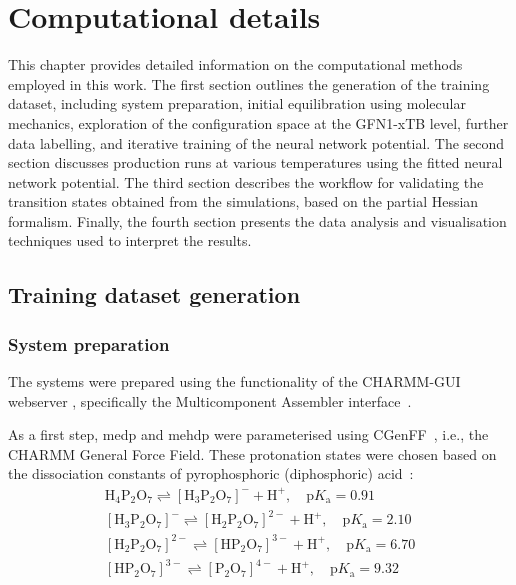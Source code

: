 \chapter{Computational details}
This chapter provides detailed information on the computational methods employed in this work. The first section outlines the generation of the training dataset, including system preparation, initial equilibration using molecular mechanics, exploration of the configuration space at the GFN1-xTB level, further data labelling, and iterative training of the neural network potential. The second section discusses production runs at various temperatures using the fitted neural network potential. The third section describes the workflow for validating the transition states obtained from the simulations, based on the partial Hessian formalism. Finally, the fourth section presents the data analysis and visualisation techniques used to interpret the results.


\section{Training dataset generation}

\subsection{System preparation}
The systems were prepared using the functionality of the CHARMM-GUI webserver \citep{joCHARMMGUIWebbasedGraphical2008}, specifically the Multicomponent Assembler interface~\citep{kernCHARMMGUIMulticomponentAssembler2024}.

As a first step, \acf{medp} and \acf{mehdp} were parameterised using CGenFF~\citep{kimCHARMMGUILigandReader2017}, i.e., the CHARMM General Force Field. These protonation states were chosen based on the dissociation constants of pyrophosphoric (diphosphoric) acid~\citep{haynesCRCHandbookChemistry2016}:
\begin{align*}
    \mathrm{H_4P_2O_7} \rightleftharpoons \mathrm{[H_3P_2O_7]^-} + \mathrm{H^+},\quad \mathrm{p}K_\mathrm{a} = 0.91 \\
    \mathrm{[H_3P_2O_7]^-} \rightleftharpoons \mathrm{[H_2P_2O_7]^{2-}} + \mathrm{H^+},\quad \mathrm{p}K_\mathrm{a} = 2.10 \\
    \mathrm{[H_2P_2O_7]^{2-}} \rightleftharpoons \mathrm{[HP_2O_7]^{3-}} + \mathrm{H^+},\quad \mathrm{p}K_\mathrm{a} = 6.70 \\
    \mathrm{[HP_2O_7]^{3-}} \rightleftharpoons \mathrm{[P_2O_7]^{4-}} + \mathrm{H^+},\quad \mathrm{p}K_\mathrm{a} = 9.32
\end{align*}

